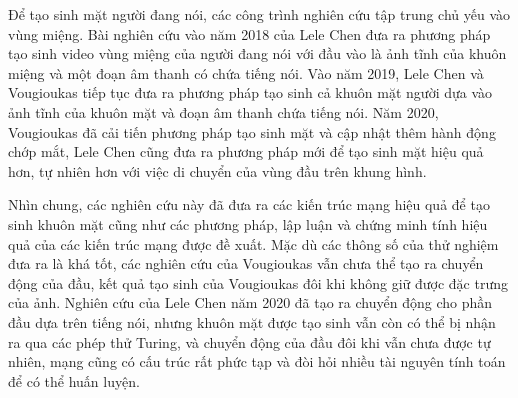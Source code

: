 Để tạo sinh mặt người đang nói, các công trình nghiên cứu tập trung chủ yếu vào vùng miệng. Bài nghiên cứu vào năm 2018 của Lele Chen \cite{chen2018} đưa ra phương pháp tạo sinh video vùng miệng của người đang nói với đầu vào là ảnh tĩnh của khuôn miệng và một đoạn âm thanh có chứa tiếng nói. Vào năm 2019, Lele Chen \cite{chen2019} và Vougioukas \cite{vougioukas2019} tiếp tục đưa ra phương pháp tạo sinh cả khuôn mặt người dựa vào ảnh tĩnh của khuôn mặt và đoạn âm thanh chứa tiếng nói. Năm 2020, Vougioukas \cite{vougioukas2020} đã cải tiến phương pháp tạo sinh mặt và cập nhật thêm hành động chớp mắt, Lele Chen \cite{chen2020} cũng đưa ra phương pháp mới để tạo sinh mặt hiệu quả hơn, tự nhiên hơn với việc di chuyển của vùng đầu trên khung hình.
 
Nhìn chung, các nghiên cứu này đã đưa ra các kiến trúc mạng hiệu quả để tạo sinh khuôn mặt cũng như các phương pháp, lập luận và chứng minh tính hiệu quả của các kiến trúc mạng được đề xuất. Mặc dù các thông số của thử nghiệm đưa ra là khá tốt, các nghiên cứu của Vougioukas vẫn chưa thể tạo ra chuyển động của đầu, kết quả tạo sinh của Vougioukas đôi khi không giữ được đặc trưng của ảnh. Nghiên cứu của Lele Chen năm 2020 \cite{chen2020} đã tạo ra chuyển động cho phần đầu dựa trên tiếng nói, nhưng khuôn mặt được tạo sinh vẫn còn có thể bị nhận ra qua các phép thử Turing, và chuyển động của đầu đôi khi vẫn chưa được tự nhiên, mạng cũng có cấu trúc rất phức tạp và đòi hỏi nhiều tài nguyên tính toán để có thể huấn luyện.
